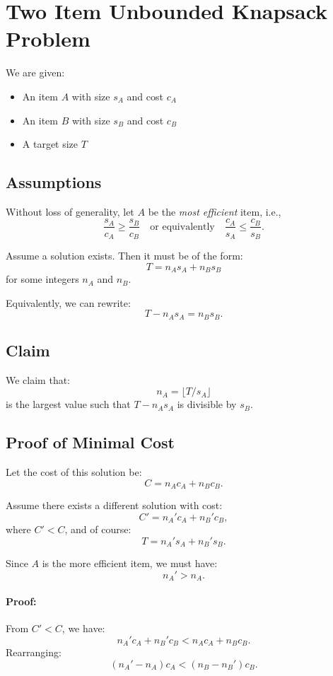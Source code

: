 \documentclass{article}
\begin{document}
\section*{Two Item Unbounded Knapsack Problem}

We are given:
\begin{itemize}
    \item An item $A$ with size $s_A$ and cost $c_A$
    \item An item $B$ with size $s_B$ and cost $c_B$
    \item A target size $T$
\end{itemize}

\subsection*{Assumptions}
Without loss of generality, let $A$ be the \emph{most efficient} item, i.e.,
\[
\frac{s_A}{c_A} \geq \frac{s_B}{c_B} \quad \text{or equivalently} \quad \frac{c_A}{s_A} \leq \frac{c_B}{s_B}.
\]

Assume a solution exists. Then it must be of the form:
\[
T = n_A s_A + n_B s_B
\]
for some integers $n_A$ and $n_B$.

Equivalently, we can rewrite:
\[
T - n_A s_A = n_B s_B.
\]

\subsection*{Claim}
We claim that:
\[
n_A = \lfloor T / s_A \rfloor
\]
is the largest value such that $T - n_A s_A$ is divisible by $s_B$.

\subsection*{Proof of Minimal Cost}
Let the cost of this solution be:
\[
C = n_A c_A + n_B c_B.
\]

Assume there exists a different solution with cost:
\[
C' = n_A' c_A + n_B' c_B,
\]
where $C' < C$, and of course:
\[
T = n_A' s_A + n_B' s_B.
\]

Since $A$ is the more efficient item, we must have:
\[
n_A' > n_A.
\]

\paragraph{Proof:}
From $C' < C$, we have:
\[
n_A' c_A + n_B' c_B < n_A c_A + n_B c_B.
\]
Rearranging:
\[
(n_A' - n_A) c_A < (n_B - n_B') c_B.
\]
\end{document}
